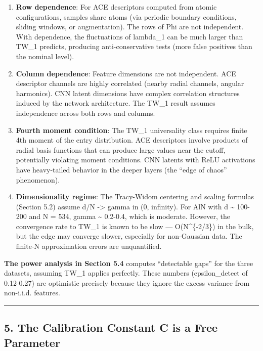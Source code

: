 \documentclass[
  12pt,
]{article}
\begin{document}
\begin{enumerate}
\def\labelenumi{\arabic{enumi}.}
\item
  \textbf{Row dependence}: For ACE descriptors computed from atomic
  configurations, samples share atoms (via periodic boundary conditions,
  sliding windows, or augmentation). The rows of Phi are not
  independent. With dependence, the fluctuations of lambda\_1 can be
  much larger than TW\_1 predicts, producing anti-conservative tests
  (more false positives than the nominal level).
\item
  \textbf{Column dependence}: Feature dimensions are not independent.
  ACE descriptor channels are highly correlated (nearby radial channels,
  angular harmonics). CNN latent dimensions have complex correlation
  structures induced by the network architecture. The TW\_1 result
  assumes independence across both rows and columns.
\item
  \textbf{Fourth moment condition}: The TW\_1 universality class
  requires finite 4th moment of the entry distribution. ACE descriptors
  involve products of radial basis functions that can produce large
  values near the cutoff, potentially violating moment conditions. CNN
  latents with ReLU activations have heavy-tailed behavior in the deeper
  layers (the ``edge of chaos'' phenomenon).
\item
  \textbf{Dimensionality regime}: The Tracy-Widom centering and scaling
  formulas (Section 5.2) assume d/N -\textgreater{} gamma in (0,
  infinity). For AlN with d \textasciitilde{} 100-200 and N = 534, gamma
  \textasciitilde{} 0.2-0.4, which is moderate. However, the convergence
  rate to TW\_1 is known to be slow --- O(N\^{}\{-2/3\}) in the bulk,
  but the edge may converge slower, especially for non-Gaussian data.
  The finite-N approximation errors are unquantified.
\end{enumerate}

\textbf{The power analysis in Section 5.4} computes ``detectable gaps''
for the three datasets, assuming TW\_1 applies perfectly. These numbers
(epsilon\_detect of 0.12-0.27) are optimistic precisely because they
ignore the excess variance from non-i.i.d. features.

\begin{center}\rule{0.5\linewidth}{0.5pt}\end{center}

\subsection{5. The Calibration Constant C is a Free
Parameter}\label{the-calibration-constant-c-is-a-free-parameter}
\end{document}
